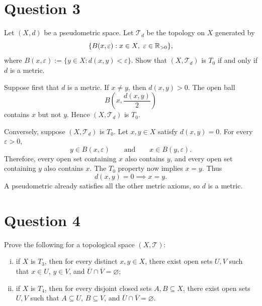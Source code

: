 \documentclass{article}
\begin{document}
\section{Question 3}

Let $(X,d)$ be a pseudometric space. Let $\mathcal{T}_d$ be the topology on
$X$ generated by
\[
  \{B(x,\varepsilon):x\in X,\ \varepsilon\in\R_{>0}\},
\]
where $B(x,\varepsilon):=\{y\in X:d(x,y)<\varepsilon\}$. Show that
$(X,\mathcal{T}_d)$ is $T_0$ if and only if $d$ is a metric.

\begin{solution}
  Suppose first that $d$ is a metric. If $x\ne y$, then $d(x,y)>0$.
  The open ball
  \[
    B\left(x,\frac{d(x,y)}2\right)
  \]
  contains $x$ but not $y$. Hence $(X,\mathcal{T}_d)$ is $T_0$.

  Conversely, suppose $(X,\mathcal{T}_d)$ is $T_0$. Let $x,y\in X$ satisfy
  $d(x,y)=0$. For every $\varepsilon>0$,
  \[
    y\in B(x,\varepsilon)\qquad\text{and}\qquad
    x\in B(y,\varepsilon).
  \]
  Therefore, every open set containing $x$ also contains $y$, and every
  open set containing $y$ also contains $x$. The $T_0$ property now implies
  $x=y$. Thus
  \[
    d(x,y)=0\implies x=y.
  \]
  A pseudometric already satisfies all the other metric axioms, so $d$ is a
  metric.
\end{solution}

\section{Question 4}

Prove the following for a topological space $(X,\mathcal{T})$:
\begin{enumerate}[(i)]
  \item if $X$ is $T_3$, then for every distinct $x,y\in X$, there exist
    open sets $U,V$ such that $x\in U$, $y\in V$, and
    $\overline{U}\cap\overline{V}=\varnothing$;
  \item if $X$ is $T_4$, then for every disjoint closed sets $A,B\subseteq X$,
    there exist open sets $U,V$ such that $A\subseteq U$, $B\subseteq V$, and
    $\overline{U}\cap\overline{V}=\varnothing$.
\end{enumerate}
\end{document}
